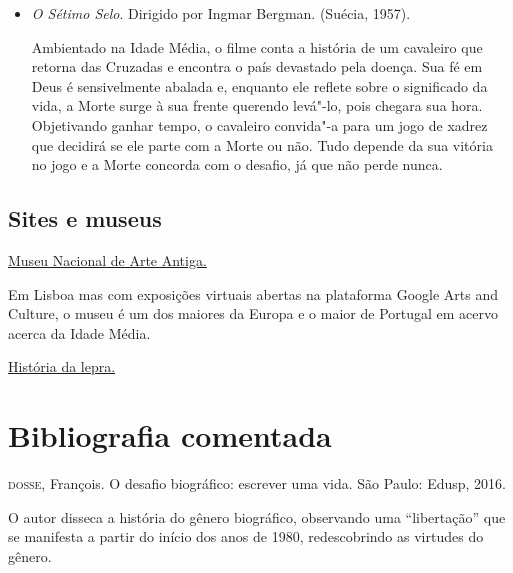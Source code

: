\documentclass[12pt]{extarticle}
\begin{document}
\begin{itemize}
	Animação dos estúdios Walt Disney, é baseada na história real da indígena do povo Powahtan
	que, sob condições escusas do contexto colonial norte"-americano, se casa com um inglês
	e vai com ele para a Inglaterra. É interessante se observar as diferenças e 
	semelhanças entre o enredo do filme da Disney e o capítulo do livro de Schwob,
	já que ambos partem da mesma história.

	\item\textit{O Sétimo Selo}. Dirigido por Ingmar Bergman. (Suécia, 1957).

	Ambientado na Idade Média, o filme conta a história de um cavaleiro que retorna 
	das Cruzadas e encontra o país devastado pela doença. Sua fé em Deus é sensivelmente 
	abalada e, enquanto ele reflete sobre o significado da vida, a Morte surge à sua 
	frente querendo levá"-lo, pois chegara sua hora. Objetivando ganhar tempo, o cavaleiro 
	convida"-a para um jogo de xadrez que decidirá se ele parte com a Morte ou não. 
	Tudo depende da sua vitória no jogo e a Morte concorda com o desafio, já que não perde nunca.

\end{itemize}

\subsection{Sites e museus}

	\href{https://artsandculture.google.com/partner/national-museum-of-ancient-art}{Museu Nacional de Arte Antiga.} 

	Em Lisboa mas com exposições virtuais abertas na plataforma Google Arts and Culture, o museu 
	é um dos maiores da Europa e o maior de Portugal em acervo acerca da Idade Média.  

	\href{https://www.news-medical.net/health/History-of-leprosy-(Portuguese).aspx#:~:text=A%20lepra%20originou%20em%20%C3%81frica,das%20trevas%2C%20at%C3%A9%20aproximadamente%201870.}{História da lepra.}

\section{Bibliografia comentada}

\textsc{dosse}, François. O desafio biográfico: escrever uma vida. São
Paulo: Edusp, 2016.

O autor disseca a história do gênero biográfico, observando uma
``libertação'' que se manifesta a partir do início dos anos de 1980,
redescobrindo as virtudes do gênero.
\end{document}
